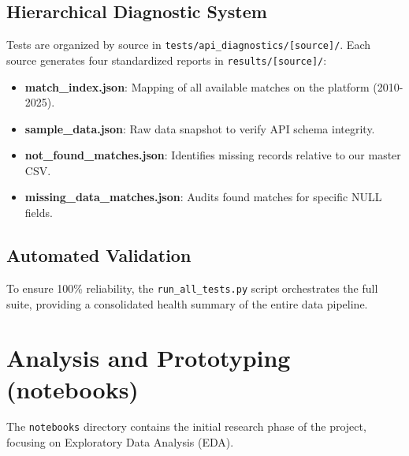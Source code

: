 \documentclass[12pt,a4paper]{article}
\begin{document}
\subsection{Hierarchical Diagnostic System}
Tests are organized by source in \texttt{tests/api_diagnostics/[source]/}. Each source generates four standardized reports in \texttt{results/[source]/}:
\begin{itemize}
    \item \textbf{match\_index.json}: Mapping of all available matches on the platform (2010-2025).
    \item \textbf{sample\_data.json}: Raw data snapshot to verify API schema integrity.
    \item \textbf{not\_found\_matches.json}: Identifies missing records relative to our master CSV.
    \item \textbf{missing\_data\_matches.json}: Audits found matches for specific NULL fields.
\end{itemize}

\subsection{Automated Validation}
To ensure 100\% reliability, the \texttt{run\_all\_tests.py} script orchestrates the full suite, providing a consolidated health summary of the entire data pipeline.

\section{Analysis and Prototyping (notebooks)}
The \texttt{notebooks} directory contains the initial research phase of the project, focusing on Exploratory Data Analysis (EDA).
\end{document}
